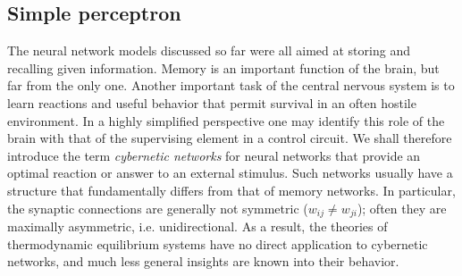 \subsection{Simple perceptron}\label{Sec:SimplePerceptron}
The neural network models discussed so far were all aimed at storing and recalling given information. Memory is an important function of the brain, but far from the only one. Another important task of the central nervous system is to learn reactions and useful behavior that permit survival in an often hostile environment. In a highly simplified perspective one may identify this role of the brain with that of the supervising element in a control circuit. We shall therefore introduce the term \emph{cybernetic networks} for neural networks that provide an optimal reaction or answer to an external stimulus. Such networks usually have a structure that fundamentally differs from that of memory networks. In particular, the synaptic connections are generally not symmetric ($w_{ij}\neq w_{ji}$); often they are maximally asymmetric, i.e. unidirectional. As a result, the theories of thermodynamic equilibrium systems have no direct application to cybernetic networks, and much less general insights are known into their behavior.

